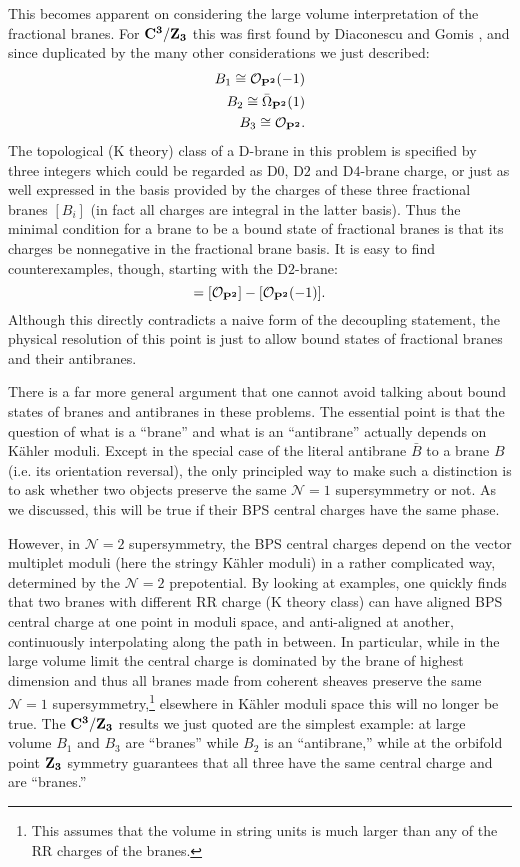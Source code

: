 \documentclass[a4paper,12pt]{amsart}
\numberwithin{equation}{section}
\theoremstyle{plain}
\theoremstyle{definition}
\def\Bbb#1{{\fam\black\relax#1}}
\def\Bbb{\bf}
\def\cal{\mathcal}
\def\BC{\Bbb{C}}
\def\P{\Bbb{P}}
\def\BZ{\Bbb{Z}}
\def\CN{{\cal N}}
\def\CO{{\cal O}}
\begin{document}
This becomes apparent on considering the large volume interpretation
of the fractional branes.  For $\BC^3/\BZ_3$ this was first found by
Diaconescu and Gomis \cite{DG}, and since duplicated by the many other
considerations we just described:
\begin{eqnarray}
B_1 \cong \CO_{\P^2}(-1) \\
B_2 \cong \bar \Omega_{\P^2}(1) \\
B_3 \cong \CO_{\P^2} .
\end{eqnarray}
The topological (K theory) class of a D-brane in this problem is
specified by three integers which could be regarded as D$0$, D$2$ and
D$4$-brane charge, or just as well expressed in the basis provided by
the charges of these three fractional branes $[B_i]$
(in fact all charges are
integral in the latter basis).  Thus the minimal condition for a brane
to be a bound state of fractional branes is that its charges be
nonnegative in the fractional brane basis.  It is easy to find
counterexamples, though, starting with the D$2$-brane:
\begin{equation}
[\CO_\Sigma] = [\CO_{\P^2}] - [\CO_{\P^2}(-1)].
\end{equation}
Although this directly contradicts a naive form of the decoupling statement,
the physical resolution of this point is just to allow bound states of
fractional branes and their antibranes.

There is a far more general argument that one cannot avoid talking
about bound states of branes and antibranes in these problems.  The
essential point is that the question of what is a ``brane'' and what
is an ``antibrane'' actually depends on K\"ahler moduli.  Except in
the special case of the literal antibrane $\bar B$ to a brane $B$
(i.e. its orientation reversal), the only principled way to make such
a distinction is to ask whether two objects preserve the same $\CN=1$
supersymmetry or not.  As we discussed, this will be true if their BPS
central charges have the same phase.

However, in $\CN=2$ supersymmetry, the BPS central charges depend on
the vector multiplet moduli (here the stringy K\"ahler moduli) in a
rather complicated way, determined by the $\CN=2$ prepotential.  By
looking at examples, one quickly finds that two branes with different
RR charge (K theory class) can have aligned BPS central charge at one
point in moduli space, and anti-aligned at another, continuously
interpolating along the path in between.  In particular, while in the
large volume limit the central charge is dominated by the brane of
highest dimension and thus all branes made from coherent sheaves
preserve the same $\CN=1$ supersymmetry,\footnote{ This assumes that
the volume in string units is much larger than any of the RR charges
of the branes.} elsewhere in K\"ahler moduli space this will no longer
be true.  The $\BC^3/\BZ_3$ results we just quoted are the simplest
example: at large volume $B_1$ and $B_3$ are ``branes'' while $B_2$ is
an ``antibrane,'' while at the orbifold point $\BZ_3$ symmetry
guarantees that all three have the same central charge and are
``branes.''
\end{document}
